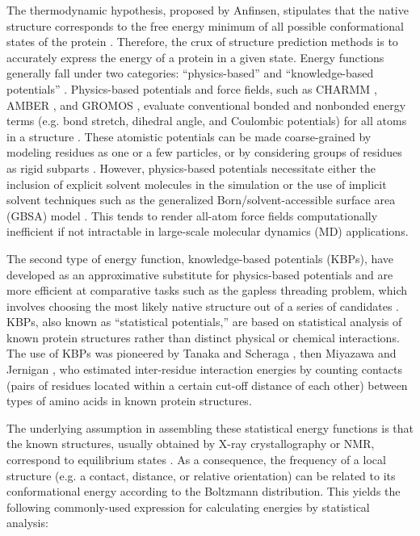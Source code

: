 \documentclass[11pt,titlepage]{article}
\begin{document}
The thermodynamic hypothesis, proposed by Anfinsen, stipulates that the native structure corresponds to the free energy minimum of all possible conformational states of the protein \cite{anfinsen}.
Therefore, the crux of structure prediction methods is to accurately express the energy of a protein in a given state. 
Energy functions generally fall under two categories: ``physics-based'' and ``knowledge-based potentials'' \cite{lu}.
Physics-based potentials and force fields, such as CHARMM \cite{brooks}, AMBER \cite{amber}, and GROMOS \cite{gromos}, evaluate conventional bonded and nonbonded energy terms (e.g. bond stretch, dihedral angle, and Coulombic potentials) for all atoms in a structure \cite{brooks2}.
These atomistic potentials can be made coarse-grained by modeling residues as one or a few particles, or by considering groups of residues as rigid subparts \cite{basdevant,potestio,enciso,monticelli}.
However, physics-based potentials necessitate either the inclusion of explicit solvent molecules in the simulation \cite{onufriev} or the use of implicit solvent techniques such as the generalized Born/solvent-accessible surface area (GBSA) model \cite{feig,roux}.
This tends to render all-atom force fields computationally inefficient if not intractable in large-scale molecular dynamics (MD) applications.

The second type of energy function, knowledge-based potentials (KBPs), have developed as an approximative substitute for physics-based potentials and are more efficient at comparative tasks such as the gapless threading problem, which involves choosing the most likely native structure out of a series of candidates \cite{thomas2}.
KBPs, also known as ``statistical potentials,'' are based on statistical analysis of known protein structures rather than distinct physical or chemical interactions. 
The use of KBPs was pioneered by Tanaka and Scheraga \cite{tanaka}, then Miyazawa and Jernigan \cite{miyazawa}, who estimated inter-residue interaction energies by counting contacts (pairs of residues located within a certain cut-off distance of each other) between types of amino acids in known protein structures.

The underlying assumption in assembling these statistical energy functions is that the known structures, usually obtained by X-ray crystallography or NMR, correspond to equilibrium states \cite{buchete2003}. 
As a consequence, the frequency of a local structure (e.g. a contact, distance, or relative orientation) can be related to its conformational energy according to the Boltzmann distribution.
This yields the following commonly-used expression for calculating energies by statistical analysis:
\end{document}
